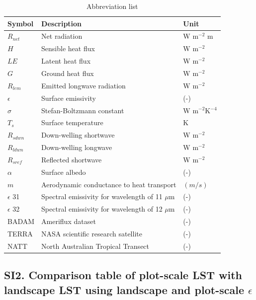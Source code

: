 \documentclass[fleqn,10pt]{wlscirep}
\begin{document}
{\begin{table}[h!]
\centering
\caption{Abbreviation list}
\begin{tabular}{p{2.5cm} p{4.0cm} p{3.0cm}}

\hline

Symbol & Description & Unit\\

\hline
$R_{net}$ & Net radiation & W m$^{-2}$ m \\
$H$ & Sensible heat flux & W m$^{-2}$ \\
$LE$ & Latent heat flux & W m$^{-2}$ \\
$G$ & Ground heat flux & W m$^{-2}$ \\
$R_{lem}$ & Emitted longwave radiation & W m$^{-2}$ \\
$\epsilon$ & Surface emissivity & (-)\\
$\sigma$ & Stefan-Boltzmann constant & W m$^{-2}$K$^{-4}$\\
$T_{s}$ & Surface temperature & K\\
$R_{sdwn}$ & Down-welling shortwave & W m$^{-2}$\\
$R_{ldwn}$ & Down-welling longwave & W m$^{-2}$\\
$R_{sref}$ & Reflected shortwave & W m$^{-2}$\\
$\alpha$ & Surface albedo & (-)\\
$m$ & Aerodynamic conductance to heat transport & $(m/s)$\\
$\epsilon$ 31 & Spectral emissivity for wavelength of 11 $\mu$m & (-) \\
$\epsilon$ 32 & Spectral emissivity for wavelength of 12 $\mu$m & (-)  \\
BADAM & Ameriflux dataset & (-) \\
TERRA & NASA scientific research satellite & (-)  \\
NATT & North Australian Tropical Transect & (-) \\

\hline
\end{tabular}
\label{table:SI2}
\end{table}

\subsection*{SI2. Comparison table of plot-scale LST with landscape LST using landscape and plot-scale $\epsilon$}

}
\end{document}
